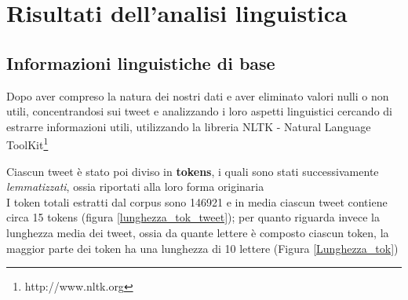 \chapter{Risultati dell'analisi linguistica}

\section{Informazioni linguistiche di base}
Dopo aver compreso la natura dei nostri dati e aver eliminato valori nulli o non utili, concentrandosi sui tweet e analizzando i loro aspetti linguistici cercando di estrarre informazioni utili, utilizzando la libreria NLTK - Natural Language ToolKit\footnote{http://www.nltk.org}



Ciascun tweet è stato poi diviso in \textbf{tokens}, i quali sono stati successivamente \textit{lemmatizzati}, ossia riportati alla loro forma originaria \\
I token totali estratti dal corpus sono 146921 e in media ciascun tweet contiene circa 15 tokens (figura \ref{lunghezza_tok_tweet}); per quanto riguarda invece la lunghezza media dei tweet, ossia da quante lettere è composto ciascun token, la maggior parte dei token ha una lunghezza di 10 lettere (Figura \ref{Lunghezza_tok})

